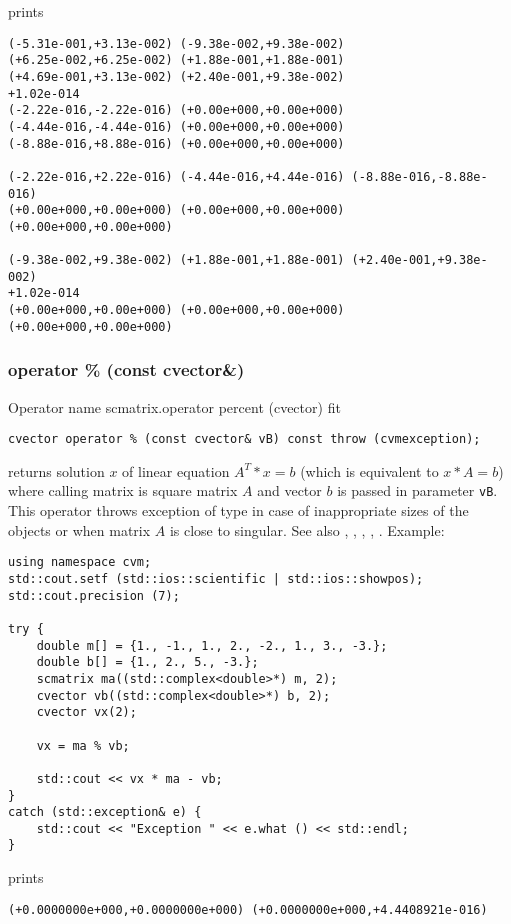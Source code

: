 prints
\begin{Verbatim}
(-5.31e-001,+3.13e-002) (-9.38e-002,+9.38e-002)
(+6.25e-002,+6.25e-002) (+1.88e-001,+1.88e-001)
(+4.69e-001,+3.13e-002) (+2.40e-001,+9.38e-002)
+1.02e-014
(-2.22e-016,-2.22e-016) (+0.00e+000,+0.00e+000)
(-4.44e-016,-4.44e-016) (+0.00e+000,+0.00e+000)
(-8.88e-016,+8.88e-016) (+0.00e+000,+0.00e+000)

(-2.22e-016,+2.22e-016) (-4.44e-016,+4.44e-016) (-8.88e-016,-8.88e-016)
(+0.00e+000,+0.00e+000) (+0.00e+000,+0.00e+000) (+0.00e+000,+0.00e+000)

(-9.38e-002,+9.38e-002) (+1.88e-001,+1.88e-001) (+2.40e-001,+9.38e-002)
+1.02e-014
(+0.00e+000,+0.00e+000) (+0.00e+000,+0.00e+000) (+0.00e+000,+0.00e+000)
\end{Verbatim}
\newpage





\subsubsection{operator \% (const cvector\&)}
Operator%
\pdfdest name {scmatrix.operator percent (cvector)} fit
\begin{verbatim}
cvector operator % (const cvector& vB) const throw (cvmexception);
\end{verbatim}
returns solution $x$ of  linear equation
$A^T*x=b$ (which is equivalent to $x*A=b$) 
where calling matrix is square matrix $A$
and vector $b$ is passed in parameter \verb"vB".
This operator throws exception 
of type 
in case of inappropriate sizes
of the objects or when  matrix $A$ is close to singular.
See also , 
, 
, 
, .
Example:
\begin{Verbatim}
using namespace cvm;
std::cout.setf (std::ios::scientific | std::ios::showpos);
std::cout.precision (7);

try {
    double m[] = {1., -1., 1., 2., -2., 1., 3., -3.};
    double b[] = {1., 2., 5., -3.};
    scmatrix ma((std::complex<double>*) m, 2);
    cvector vb((std::complex<double>*) b, 2);
    cvector vx(2);

    vx = ma % vb;

    std::cout << vx * ma - vb;
}
catch (std::exception& e) {
    std::cout << "Exception " << e.what () << std::endl;
}
\end{Verbatim}
prints
\begin{Verbatim}
(+0.0000000e+000,+0.0000000e+000) (+0.0000000e+000,+4.4408921e-016)
\end{Verbatim}
\newpage





